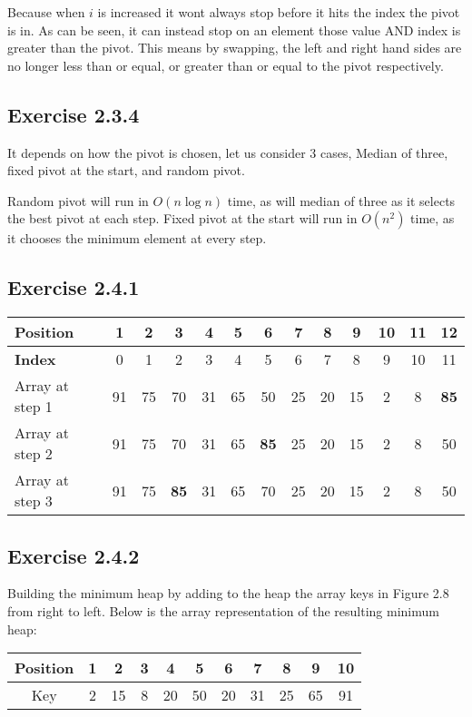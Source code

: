 \documentclass{article}
\begin{document}
Because when \(i\) is increased it wont always stop before it hits the index the pivot is in. As can be seen, it can instead stop on an element those value AND index is greater than the pivot. This means by swapping, the left and right hand sides are no longer less than or equal, or greater than or equal to the pivot respectively. 


\subsection*{Exercise 2.3.4}

It depends on how the pivot is chosen, let us consider 3 cases, Median of three, fixed pivot at the start, and random pivot. 

Random pivot will run in \(O(n\log{n})\) time, as will median of three as it selects the best pivot at each step. Fixed pivot at the start will run in \(O(n^2)\) time, as it chooses the minimum element at every step. 


\subsection*{Exercise 2.4.1}

\begin{tabular}{|l|c|c|c|c|c|c|c|c|c|c|c|c|}
\hline
\textbf{Position}& 1& 2& 3& 4& 5& 6& 7& 8& 9& 10& 11& 12 \\
\hline
\textbf{Index}& 0& 1& 2& 3& 4& 5& 6& 7& 8& 9& 10& 11 \\
\hline
Array at step 1& 91& 75& 70& 31& 65& 50& 25& 20& 15& 2& 8& \textbf{85} \\
\hline
Array at step 2& 91& 75& 70& 31& 65& \textbf{85}& 25& 20& 15& 2& 8& 50 \\
\hline
Array at step 3& 91& 75& \textbf{85}& 31& 65& 70& 25& 20& 15& 2& 8& 50 \\
\hline
\end{tabular}


\subsection*{Exercise 2.4.2}

Building the minimum heap by adding to the heap the array keys in Figure 2.8 from right to left. Below is the array representation of the resulting minimum heap:

\begin{tabular}{|c|c|c|c|c|c|c|c|c|c|c|}
\hline
Position& 1& 2& 3& 4& 5& 6& 7& 8& 9& 10 \\
\hline
Key& 2& 15& 8& 20& 50& 20& 31& 25& 65& 91 \\
\hline
\end{tabular}
\end{document}
